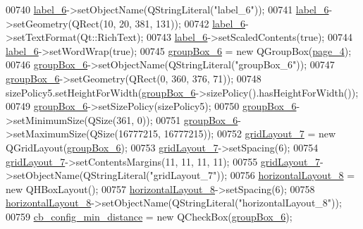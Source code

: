 \begin{DoxyCode}
00740         \hyperlink{a00080_a663f728e6244926a795c6e6892673b1d}{label\_6}->setObjectName(QStringLiteral(\textcolor{stringliteral}{"label\_6"}));
00741         \hyperlink{a00080_a663f728e6244926a795c6e6892673b1d}{label\_6}->setGeometry(QRect(10, 20, 381, 131));
00742         \hyperlink{a00080_a663f728e6244926a795c6e6892673b1d}{label\_6}->setTextFormat(Qt::RichText);
00743         \hyperlink{a00080_a663f728e6244926a795c6e6892673b1d}{label\_6}->setScaledContents(\textcolor{keyword}{true});
00744         \hyperlink{a00080_a663f728e6244926a795c6e6892673b1d}{label\_6}->setWordWrap(\textcolor{keyword}{true});
00745         \hyperlink{a00080_a40a9931365fd3679efec4f0112073db2}{groupBox\_6} = \textcolor{keyword}{new} QGroupBox(\hyperlink{a00080_ad52b1b3da7f1a695b9d3b521254c961d}{page\_4});
00746         \hyperlink{a00080_a40a9931365fd3679efec4f0112073db2}{groupBox\_6}->setObjectName(QStringLiteral(\textcolor{stringliteral}{"groupBox\_6"}));
00747         \hyperlink{a00080_a40a9931365fd3679efec4f0112073db2}{groupBox\_6}->setGeometry(QRect(0, 360, 376, 71));
00748         sizePolicy5.setHeightForWidth(\hyperlink{a00080_a40a9931365fd3679efec4f0112073db2}{groupBox\_6}->sizePolicy().hasHeightForWidth());
00749         \hyperlink{a00080_a40a9931365fd3679efec4f0112073db2}{groupBox\_6}->setSizePolicy(sizePolicy5);
00750         \hyperlink{a00080_a40a9931365fd3679efec4f0112073db2}{groupBox\_6}->setMinimumSize(QSize(361, 0));
00751         \hyperlink{a00080_a40a9931365fd3679efec4f0112073db2}{groupBox\_6}->setMaximumSize(QSize(16777215, 16777215));
00752         \hyperlink{a00080_a4c2d544352d423a361b8ab2e1d5636ec}{gridLayout\_7} = \textcolor{keyword}{new} QGridLayout(\hyperlink{a00080_a40a9931365fd3679efec4f0112073db2}{groupBox\_6});
00753         \hyperlink{a00080_a4c2d544352d423a361b8ab2e1d5636ec}{gridLayout\_7}->setSpacing(6);
00754         \hyperlink{a00080_a4c2d544352d423a361b8ab2e1d5636ec}{gridLayout\_7}->setContentsMargins(11, 11, 11, 11);
00755         \hyperlink{a00080_a4c2d544352d423a361b8ab2e1d5636ec}{gridLayout\_7}->setObjectName(QStringLiteral(\textcolor{stringliteral}{"gridLayout\_7"}));
00756         \hyperlink{a00080_a8ead8fc876ee91c30864822eedb9c370}{horizontalLayout\_8} = \textcolor{keyword}{new} QHBoxLayout();
00757         \hyperlink{a00080_a8ead8fc876ee91c30864822eedb9c370}{horizontalLayout\_8}->setSpacing(6);
00758         \hyperlink{a00080_a8ead8fc876ee91c30864822eedb9c370}{horizontalLayout\_8}->setObjectName(QStringLiteral(\textcolor{stringliteral}{"horizontalLayout\_8"}));
00759         \hyperlink{a00080_a6b0d09f3b380fdb810d3da3f5208ccf5}{cb\_config\_min\_distance} = \textcolor{keyword}{new} QCheckBox(\hyperlink{a00080_a40a9931365fd3679efec4f0112073db2}{groupBox\_6});

\end{DoxyCode}

